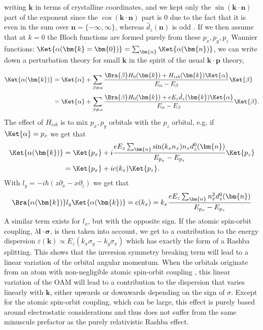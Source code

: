 writing $\bm{k}$ in terms of crystalline coordinates, and we kept only the $\sin(\bm{k}\cdot\bm{n})$ part of the exponent since the $\cos(\bm{k}\cdot\bm{n})$ part is $0$ due to the fact that it is even in the sum over $\bm{n} = \{-\infty, \infty\}$, whereas $\hat{d}_z(\bm{n})$ is odd . If we then assume that at $k=0$ the Bloch functions are formed purely from these $p_x,p_y,p_z$ Wannier functions: $\Ket{\alpha(\bm{k}=\bm{0})} = \sum_{\bm{n}} \Ket{\alpha(\bm{n})}$, we can write down a perturbation theory for small $\bm{k}$ in the spirit of the usual $\bm{k}\cdot\bm{p}$ theory,

\begin{align}
	\Ket{\alpha(\bm{k})}&=\Ket{\alpha} + \sum_{\beta \neq \alpha} \frac{\Bra{\beta} H_0(\bm{k}) + H_{isb}(\bm{k}) \Ket{\alpha}}{E_{\alpha} - E_{\beta}} \Ket{\beta}\\
	&=\Ket{\alpha} + \sum_{\beta \neq \alpha} \frac{\Bra{\beta} H_0(\bm{k}) + e E_z \hat{d}_z(\bm{k}) \Ket{\alpha}}{E_{\alpha} - E_{\beta}} \Ket{\beta}.
\end{align}
The effect of $H_{isb}$ is to mix $p_x, p_y$ orbitals with the $p_z$ orbital, e.g. if $\Ket{\alpha} = p_x$ we get that
\begin{align}
	\Ket{\alpha(\bm{k})} &= \Ket{p_x} + i \frac{e E_z \sum_{\bm{n}} \sin(k_x n_x)n_x d_z^0(\bm{n})}{E_{p_x} - E_{p_z}} \Ket{p_z}\\
	&=\Ket{p_x} + i c(k_x) \Ket{p_z}.
\end{align}
With $l_y = -i\hbar(z \partial_x - x \partial_z )$ we get that
\begin{equation}
	\label{eq:oam_from_k}
	\Bra{\alpha(\bm{k})} l_y \Ket{\alpha(\bm{k})} = c(k_x) = k_x \frac{e E_z \sum_{\bm{n}} n_x^2d_z^0(\bm{n})}{E_{p_x} - E_{p_z}}
\end{equation}
A similar term exists for $l_x$, but with the opposite sign. If the atomic spin-orbit coupling, $\lambda \bm{l}\cdot\bm{\sigma}$, is then taken into account, we get to a contribution to the energy dispersion $\varepsilon(\bm{k}) \propto E_z (k_x \sigma_y - k_y \sigma_x)$ which has exactly the form of a Rashba splitting. 
This shows that the inversion symmetry breaking term will lead to a linear variation of the orbital angular momentum. When the orbitals originate from an atom with non-negligible atomic spin-orbit coupling , this linear variation of the OAM will lead to a contribution to the dispersion that varies linearly with $\bm{k}$, either upwards or downwards depending on the sign of $\sigma$. Except for the atomic spin-orbit coupling, which can be large, this effect is purely based around electrostatic considerations and thus does not suffer from the same minuscule prefactor as the purely relativistic Rashba effect.

